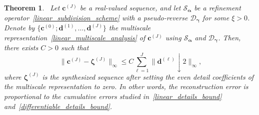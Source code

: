 \documentclass[12pt]{article}
\newtheorem{theorem}{Theorem}[section]
\begin{document}
\begin{theorem}~\label{thm:synthesis_theorem}
    Let $\boldsymbol{c}^{(J)}$ be a real-valued sequence, and let $\mathcal{S}_{\boldsymbol{\alpha}}$ be a refinement operator~\eqref{linear_subdivision_scheme} with a pseudo-reverse $\mathcal{D}_{\boldsymbol{\gamma}}$ for some $\xi>0$. Denote by $\{\boldsymbol{c}^{(0)};\boldsymbol{d}^{(1)},\dots,\boldsymbol{d}^{(J)}\}$ the multiscale representation~\eqref{linear_multiscale_analysis} of $\boldsymbol{c}^{(J)}$ using $\mathcal{S}_{\boldsymbol{\alpha}}$ and $ \mathcal{D}_{\boldsymbol{\gamma}}$. Then, there exists $C>0$ such that
    \begin{equation}~\label{synthesis_bound}
        \|\boldsymbol{c}^{(J)} - \boldsymbol{\zeta}^{(J)}\|_\infty \leq C\sum_{\ell=1}^{J}\|\boldsymbol{d}^{(\ell)}\downarrow 2\|_\infty,
    \end{equation}
    where $\boldsymbol{\zeta}^{(J)}$ is the synthesized sequence after setting the even detail coefficients of the multiscale representation to zero. In other words, the reconstruction error is proportional to the cumulative errors studied in~\eqref{linear_details_bound} and~\eqref{differentiable_details_bound}.
\end{theorem}
\end{document}
